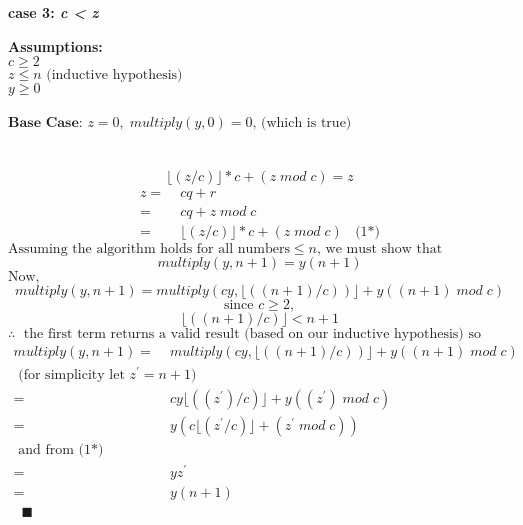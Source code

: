 \begin{minipage}{0.95\textwidth}
\textbf{case 3: \emph{c < z}}
\begin{flushleft}
	\textbf{Assumptions: } \\
	$c \geq 2$ \\
	$z \leq n \text{ (inductive hypothesis) }$ \\
	$y \geq 0$ \\
	\text{} \\
	$\textbf{Base Case: } z = 0, \; multiply(y,0) = 0 \text{, (which is true)}$ \\ 
	\text{} \\
	 \\
	$$\lfloor(z/c)\rfloor*c + (z \;mod\; c) = z $$ 
	\begin{align*}
	z =& \; cq + r \\
	  =& \; cq + z \;mod\; c \\ 
	  =& \; \lfloor(z/c)\rfloor*c + (z \;mod\; c) \;\; \text{ (1*)}
	\end{align*}
	$\text{Assuming the algorithm holds for all numbers}  \leq n  \text{, we must show that  } $ \\
	$$multiply(y, n + 1) = y(n+1) $$
	$\text{Now, }$ \\
	$$multiply(y, n + 1) = multiply(cy, \lfloor((n+1)/c))\rfloor + y((n+1) \;mod\; c) $$
	$$\text{since } c \geq 2, $$
	$$\lfloor((n+1)/c)\rfloor < n + 1 $$
	$$\therefore \; \text{  the first term returns a valid result (based on our inductive hypothesis) so following the algorithm: } $$
	\begin{align*}
	  multiply(y, n + 1) =& \;  multiply(cy, \lfloor((n+1)/c))\rfloor + y((n+1) \;mod\; c)   \\
					    \text{ (for simplicity let } z^{'} = n+1 \text{)} \\
	                     =& \;  cy\lfloor((z^{'})/c)\rfloor + y((z^{'}) \;mod\; c)   \\
	                     =& \; y(c\lfloor(z^{'}/c)\rfloor + (z^{'} \;mod\; c))  \\
	                    \text{ and from (1*) } \\
 	                     =& \;  yz^{'} \\
	                     =& \;  y(n+1) \\
	                     \;\; \blacksquare
	\end{align*}
\end{flushleft}
\end{minipage}


